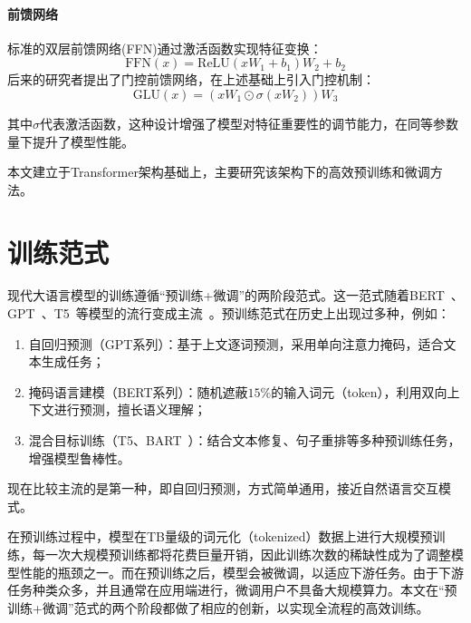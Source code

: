 \paragraph{前馈网络}
标准的双层前馈网络(FFN)通过激活函数实现特征变换：
\begin{equation}
    \text{FFN}(x) = \text{ReLU}(xW_1 + b_1)W_2 + b_2
\end{equation}
后来的研究者提出了门控前馈网络，在上述基础上引入门控机制：
\begin{equation}
    \text{GLU}(x) = (xW_1 \odot \sigma(xW_2))W_3
\end{equation}

其中$\sigma$代表激活函数，这种设计增强了模型对特征重要性的调节能力，在同等参数量下提升了模型性能。

本文建立于Transformer架构基础上，主要研究该架构下的高效预训练和微调方法。

\section{训练范式}
现代大语言模型的训练遵循“预训练+微调”的两阶段范式。这一范式随着BERT~\cite{devlin2018bert}、GPT~\cite{radford2018improving}、T5~\cite{raffel2020exploring}等模型的流行变成主流~\cite{xu2021pre}。预训练范式在历史上出现过多种，例如：
\begin{enumerate}
    \item 自回归预测（GPT系列）：基于上文逐词预测，采用单向注意力掩码，适合文本生成任务；
    \item 掩码语言建模（BERT系列）：随机遮蔽$15\%$的输入词元（token），利用双向上下文进行预测，擅长语义理解；
    \item 混合目标训练（T5、BART~\cite{lewis2019bart}）：结合文本修复、句子重排等多种预训练任务，增强模型鲁棒性。
\end{enumerate}
现在比较主流的是第一种，即自回归预测，方式简单通用，接近自然语言交互模式。

在预训练过程中，模型在TB量级的词元化（tokenized）数据上进行大规模预训练，每一次大规模预训练都将花费巨量开销，因此训练次数的稀缺性成为了调整模型性能的瓶颈之一。而在预训练之后，模型会被微调，以适应下游任务。由于下游任务种类众多，并且通常在应用端进行，微调用户不具备大规模算力。本文在“预训练+微调”范式的两个阶段都做了相应的创新，以实现全流程的高效训练。

